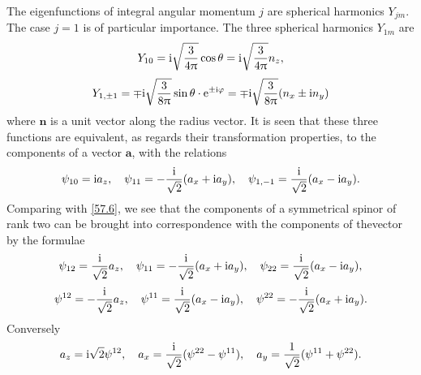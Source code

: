 The eigenfunctions of integral angular momentum $ j $ are spherical harmonics $ Y_{jm} $. The case $ j = 1 $ is of particular importance. The three spherical harmonics $ Y_{1m} $ are
\[ Y_{10}=\mathrm{i}\sqrt{\frac{3}{4\uppi}}\cos\theta=\mathrm{i}\sqrt{\frac{3}{4\uppi}}n_z, \]
\[ Y_{1,\pm1}=\mp\mathrm{i}\sqrt{\frac{3}{8\uppi}}\sin\theta\cdot\mathrm{e}^{\pm\mathrm{i}\varphi}=\mp\mathrm{i}\sqrt{\frac{3}{8\uppi}}(n_x\pm\mathrm{i} n_y) \]
where $ \bm{n} $ is a unit vector along the radius vector. It is seen that these three functions are equivalent, as regards their transformation properties, to the components of a vector $ \bm{a} $, with the relations
\begin{equation}\label{57.7}
\psi_{10}=\mathrm{i} a_z,\quad\psi_{11}=-\frac{\mathrm{i}}{\sqrt{2}}(a_x+\mathrm{i} a_y),\quad\psi_{1,-1}=\frac{\mathrm{i}}{\sqrt{2}}(a_x-\mathrm{i} a_y).
\end{equation}
Comparing with \eqref{57.6}, we see that the components of a symmetrical spinor of rank two can be brought into correspondence with the components of thevector by the formulae
\begin{equation}\label{57.8}
\psi_{12}=\frac{\mathrm{i}}{\sqrt{2}}a_z,\quad\psi_{11}=-\frac{\mathrm{i}}{\sqrt{2}}(a_x+\mathrm{i} a_y),\quad\psi_{22}=\frac{\mathrm{i}}{\sqrt{2}}(a_x-\mathrm{i} a_y),\end{equation}
\begin{equation}\label{57.9}
\psi^{12}=-\frac{\mathrm{i}}{\sqrt{2}}a_z,\quad\psi^{11}=\frac{\mathrm{i}}{\sqrt{2}}(a_x-\mathrm{i} a_y),\quad\psi^{22}=-\frac{\mathrm{i}}{\sqrt{2}}(a_x+\mathrm{i} a_y).
\end{equation}
Conversely
\begin{equation}\label{57.10}
a_z=\mathrm{i}\sqrt{2}\psi^{12},\quad a_x=\frac{\mathrm{i}}{\sqrt{2}}(\psi^{22}-\psi^{11}),\quad a_y=\frac{1}{\sqrt{2}}(\psi^{11}+\psi^{22}).
\end{equation}


